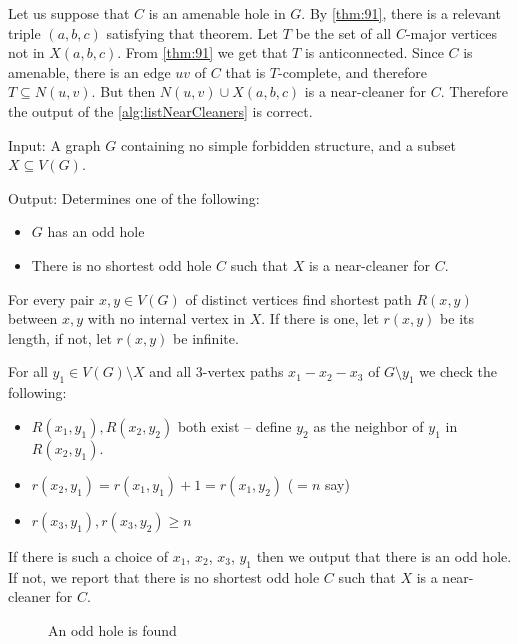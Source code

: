 Let us suppose that $C$ is an amenable hole in $G$. By \cref{thm:91}, there is a relevant triple $(a, b, c)$ satisfying that theorem. Let $T$ be the set of all $C$-major vertices not in $X(a,b,c)$. From \cref{thm:91} we get that $T$ is anticonnected. Since $C$ is amenable, there is an edge $uv$ of $C$ that is $T$-complete, and therefore $T \subseteq N(u, v)$. But then $N(u, v) \cup X(a, b, c)$ is a near-cleaner for $C$. Therefore the output of the \cref{alg:listNearCleaners} is correct.

\begin{alg}
	\label{alg:testNearCleaner}
	Input: A graph $G$ containing no simple forbidden structure, and a subset $X \subseteq V(G)$.

	\noindent Output: Determines one of the following:
	\begin{itemize}
		\item $G$ has an odd hole
		\item There is no shortest odd hole $C$ such that $X$ is a near-cleaner for $C$.
	\end{itemize}
\end{alg}
\begin{algtext}
	For every pair $x, y \in V(G)$ of distinct vertices find shortest path $R(x, y)$ between $x, y$ with no internal vertex in $X$. If there is one, let $r(x, y)$ be its length, if not, let $r(x, y)$ be infinite.

	For all $y_1 \in V(G)\setminus X$ and all 3-vertex paths $x_1-x_2-x_3$ of $G\setminus y_1$ we check the following:
	\begin{itemize}
		\item $R(x_1, y_1), R(x_2, y_2)$ both exist -- define $y_2$ as the neighbor of $y_1$ in $R(x_2, y_1)$.
		\item $r(x_2, y_1) = r(x_1, y_1) + 1 = r(x_1, y_2)$ ($=n$ say)
		\item $r(x_3, y_1), r(x_3, y_2) \geq n$
	\end{itemize}

	If there is such a choice of $x_1$, $x_2$, $x_3$, $y_1$ then we output that there is an odd hole. If not, we report that there is no shortest odd hole $C$ such that $X$ is a near-cleaner for $C$.
\end{algtext}

\begin{wrapfigure}{r}{0.35\textwidth}
	
	\caption{An odd hole is found}%
	\vspace{-0.5cm}
\end{wrapfigure}


